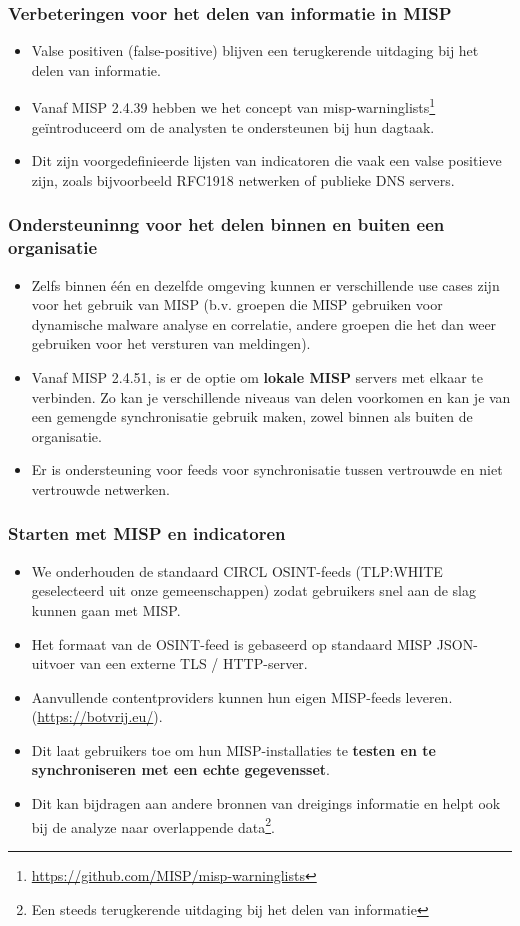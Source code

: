 \begin{frame}
\frametitle{Verbeteringen voor het delen van informatie in MISP}
\begin{itemize}
        \item Valse positiven (false-positive) blijven een terugkerende uitdaging bij het delen van informatie.
        \item Vanaf MISP 2.4.39 hebben we het concept van misp-warninglists\footnote{\url{https://github.com/MISP/misp-warninglists}} geïntroduceerd om de analysten te ondersteunen bij hun dagtaak.
        \item Dit zijn voorgedefinieerde lijsten van indicatoren die vaak een valse positieve zijn, zoals bijvoorbeeld RFC1918 netwerken of publieke DNS servers.
\end{itemize}
\end{frame}

\begin{frame}
\frametitle{Ondersteuninng voor het delen binnen en buiten een organisatie}
\begin{itemize}
        \item Zelfs binnen één en dezelfde omgeving kunnen er verschillende use cases zijn voor het gebruik van MISP (b.v. groepen die MISP gebruiken voor dynamische malware analyse en correlatie, andere groepen die het dan weer gebruiken voor het versturen van meldingen).
        \item Vanaf MISP 2.4.51, is er de optie om {\bf lokale MISP} servers met elkaar te verbinden. Zo kan je verschillende niveaus van delen voorkomen en kan je van een gemengde synchronisatie gebruik maken, zowel binnen als buiten de organisatie.
        \item Er is ondersteuning voor feeds voor synchronisatie tussen vertrouwde en niet vertrouwde netwerken.
\end{itemize}
\end{frame}

\begin{frame}
        \frametitle{Starten met MISP en indicatoren}
        \begin{itemize}
                \item We onderhouden de standaard CIRCL OSINT-feeds (TLP:WHITE geselecteerd uit onze gemeenschappen) zodat gebruikers snel aan de slag kunnen gaan met MISP.
                \item Het formaat van de OSINT-feed is gebaseerd op standaard MISP JSON-uitvoer van een externe TLS / HTTP-server.
                \item Aanvullende contentproviders kunnen hun eigen MISP-feeds leveren. (\url{https://botvrij.eu/}).
                \item Dit laat gebruikers toe om hun MISP-installaties te {\bf testen en te synchroniseren met een echte gegevensset}.
                \item Dit kan bijdragen aan andere bronnen van dreigings informatie en helpt ook bij de analyze naar overlappende data\footnote{Een steeds terugkerende uitdaging bij het delen van informatie}.
        \end{itemize}
\end{frame}


